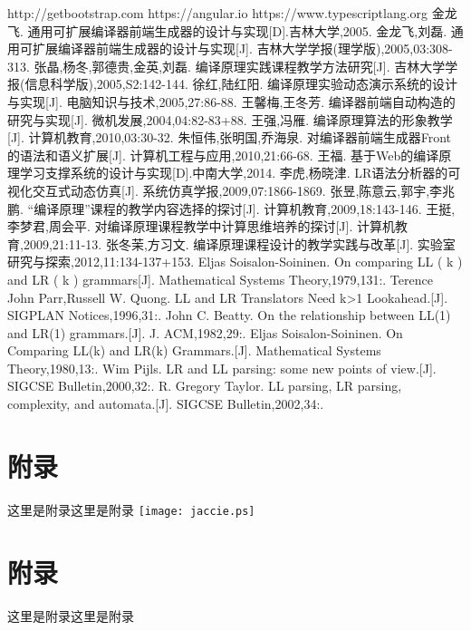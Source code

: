 \documentclass[a4paper]{article}
\newcommand{\小二}{\fontsize{18pt}{\baselineskip}\selectfont}
\newcommand{\小三}{\fontsize{15pt}{\baselineskip}\selectfont}
\newcommand{\小四}{\fontsize{12pt}{\baselineskip}\selectfont}
\begin{document}
\begin{spacing}{1.5}
\newpage
{}
\begin{thebibliography}{0}
http://getbootstrap.com
https://angular.io
https://www.typescriptlang.org
金龙飞. 通用可扩展编译器前端生成器的设计与实现[D].吉林大学,2005.
金龙飞,刘磊. 通用可扩展编译器前端生成器的设计与实现[J]. 吉林大学学报(理学版),2005,03:308-313.
张晶,杨冬,郭德贵,金英,刘磊. 编译原理实践课程教学方法研究[J]. 吉林大学学报(信息科学版),2005,S2:142-144.
徐红,陆红阳. 编译原理实验动态演示系统的设计与实现[J]. 电脑知识与技术,2005,27:86-88.
王馨梅,王冬芳. 编译器前端自动构造的研究与实现[J]. 微机发展,2004,04:82-83+88.
王强,冯雁. 编译原理算法的形象教学[J]. 计算机教育,2010,03:30-32.
朱恒伟,张明国,乔海泉. 对编译器前端生成器Front的语法和语义扩展[J]. 计算机工程与应用,2010,21:66-68.
王福. 基于Web的编译原理学习支撑系统的设计与实现[D].中南大学,2014.
李虎,杨晓津. LR语法分析器的可视化交互式动态仿真[J]. 系统仿真学报,2009,07:1866-1869.
张昱,陈意云,郭宇,李兆鹏. “编译原理”课程的教学内容选择的探讨[J]. 计算机教育,2009,18:143-146.
王挺,李梦君,周会平. 对编译原理课程教学中计算思维培养的探讨[J]. 计算机教育,2009,21:11-13.
张冬茉,方习文. 编译原理课程设计的教学实践与改革[J]. 实验室研究与探索,2012,11:134-137+153.
Eljas Soisalon-Soininen. On comparing LL ( k ) and LR ( k ) grammars[J]. Mathematical Systems Theory,1979,131:.
Terence John Parr,Russell W. Quong. LL and LR Translators Need k>1 Lookahead.[J]. SIGPLAN Notices,1996,31:.
John C. Beatty. On the relationship between LL(1) and LR(1) grammars.[J]. J. ACM,1982,29:.
Eljas Soisalon-Soininen. On Comparing LL(k) and LR(k) Grammars.[J]. Mathematical Systems Theory,1980,13:.
Wim Pijls. LR and LL parsing: some new points of view.[J]. SIGCSE Bulletin,2000,32:.
R. Gregory Taylor. LL parsing, LR parsing, complexity, and automata.[J]. SIGCSE Bulletin,2002,34:.
\end{thebibliography}

\appendix
\newpage
\section{附录}
这里是附录这里是附录
\texttt{[image: jaccie.ps]}

\newpage
\section{附录}
这里是附录这里是附录

\end{spacing}
\end{document}
